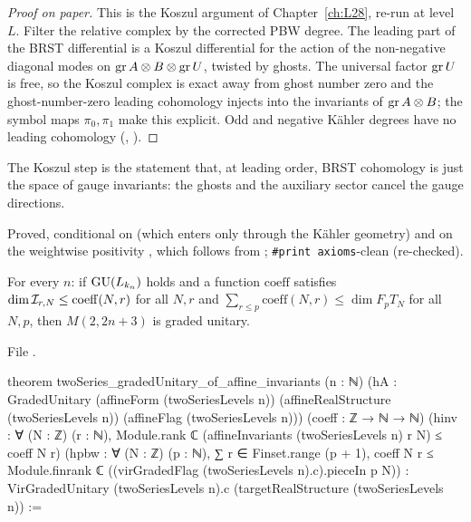 \begin{proof}[Proof on paper]
This is the Koszul argument of Chapter~\ref{ch:L28}, re-run at level $L$. Filter the relative complex by the corrected
PBW degree. The leading part of the BRST differential is a Koszul
differential for the action of the non-negative diagonal modes on $\operatorname{gr} A\otimes B\otimes\operatorname{gr} U$,
twisted by ghosts. The universal factor $\operatorname{gr} U$ is free, so the Koszul complex is exact away from ghost
number zero and the ghost-number-zero leading cohomology injects into the invariants of $\operatorname{gr} A\otimes B$; the
symbol maps $\pi_0,\pi_1$ make this explicit. Odd and negative Kähler degrees have no leading cohomology
(, ).
\end{proof}

\begin{physics}
The Koszul step is the statement that, at leading order, BRST cohomology is just the space of gauge invariants: the
ghosts and the auxiliary sector cancel the gauge directions.
\end{physics}

\begin{status}
Proved, conditional on  (which enters only through the Kähler geometry) and on the weightwise positivity , which
follows from ; \texttt{\#print axioms}-clean (re-checked).
\end{status}

\begin{theorem}\label{l29:thm:invariants}
For every $n$: if $\mathrm{GU}(L_{k_n})$ holds and a function $\mathrm{coeff}$ satisfies
$\dim\mathcal I_{r,N}\le\mathrm{coeff}(N,r)$ for all $N,r$ and
$\sum_{r\le p}\mathrm{coeff}(N,r)\le\dim F_pT_N$ for all $N,p$, then $M(2,2n+3)$ is graded unitary.
\end{theorem}

\noindent File .
\begin{leancode}
theorem twoSeries_gradedUnitary_of_affine_invariants (n : ℕ)
    (hA : GradedUnitary (affineForm (twoSeriesLevels n)) (affineRealStructure (twoSeriesLevels n))
      (affineFlag (twoSeriesLevels n)))
    (coeff : ℤ → ℕ → ℕ)
    (hinv : ∀ (N : ℤ) (r : ℕ),
      Module.rank ℂ (affineInvariants (twoSeriesLevels n) r N) ≤ coeff N r)
    (hpbw : ∀ (N : ℤ) (p : ℕ), ∑ r ∈ Finset.range (p + 1), coeff N r ≤
      Module.finrank ℂ ((virGradedFlag (twoSeriesLevels n).c).pieceIn p N)) :
    VirGradedUnitary (twoSeriesLevels n).c (targetRealStructure (twoSeriesLevels n)) :=
\end{leancode}

